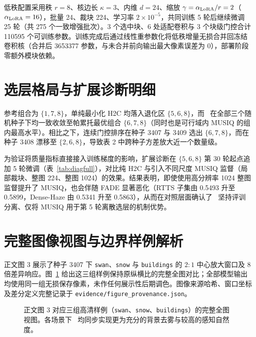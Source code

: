 \documentclass[10pt,twocolumn,letterpaper]{article}
\begin{document}
低秩配置采用秩 $r=8$、核边长 $\kappa=3$、内维 $d=24$、缩放 $\gamma=\alpha_{\rm LoRA}/r=2$（$\alpha_{\rm LoRA}=16$），批量 24、裁块 224、学习率 $2\times 10^{-5}$，共同训练 5 轮后继续微调 25 轮（共 275 个一致增强批次）。3 个选中块、6 处适配卷积与 3 个块级门控合计 110595 个可训练参数。训练完成后通过线性重参数化将低秩增量无损合并回冻结卷积核（合并后 3653377 参数，与未合并前向输出最大像素误差为 0），部署阶段零额外模块依赖。

\section{选层格局与扩展诊断明细}
参考组合为 $\{1,7,8\}$，单纯最小化 H2C 均落入退化区 $\{5,6,8\}$，而 \method~在全部三个随机种子下均一致收敛至帕累托最优组合 $\{6,7,8\}$（同时也是可行域内 MUSIQ 的组内最高水平）。相比之下，连续门控排序在种子 3407 与 3409 选出 $\{6,7,8\}$，而在种子 3408 漂移至 $\{2,6,8\}$，导致表 2 中跨种子方差放大近一个数量级。

为验证将质量指标直接接入训练梯度的影响，扩展诊断在 $\{5,6,8\}$ 第 30 轮起点追加 5 轮微调（表~\ref{tab:diagfull}），对比纯 H2C 与引入不同尺度 MUSIQ 监督（局部裁块、整图 224、整图 1024）的效果。结果表明，即使使用高分辨率 1024 整图监督提升了 MUSIQ，也会伴随 FADE 显著恶化（RTTS 子集由 0.5493 升至 0.5899，Dense-Haze 由 0.5341 升至 0.5863），从而在对照层面确认了 \method~坚持评训分离、仅将 MUSIQ 用于第 5 轮离散选层的机制优势。

\begin{table}[H]\centering\small\setlength{\tabcolsep}{2pt}

\caption{扩展监督目标对比的完整指标明细（三种子均值$\pm$标准差）。FADE 与 NIQE 越小越好，其余指标越大越好。直接优化 MUSIQ 诱发残雾指标 FADE 明显回升，从反面验证了评训分离设计的必要性。}
\label{tab:diagfull}
\end{table}

\section{完整图像视图与边界样例解析}
正文图 3 展示了种子 3407 下 \texttt{swan}、\texttt{snow} 与 \texttt{buildings} 的 $2:1$ 中心放大窗口及 8 倍差异响应。图~\ref{fig:fullphotos} 给出这三组样例保持原纵横比的完整全图对比；全部模型输出均使用同一组无损保存像素，未作任何展示性后期调色。图像来源哈希、窗口坐标及差分定义完整记录于 \texttt{evidence/figure\_provenance.json}。

\begin{figure}[H]\centering
\caption{正文图 3 对应三组高清样例（\texttt{swan}、\texttt{snow}、\texttt{buildings}）的完整全图视图。各场景下 \method~均同步实现更为充分的背景去雾与较高的感知自然度。}
\label{fig:fullphotos}
\end{figure}
\end{document}
